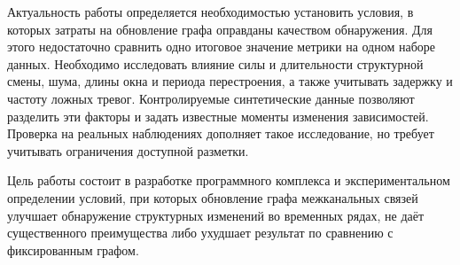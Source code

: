 \documentclass[bachelor, och, diploma]{SCWorks}
\begin{document}
Актуальность работы определяется необходимостью установить условия, в которых затраты на обновление графа оправданы качеством обнаружения. Для этого недостаточно сравнить одно итоговое значение метрики на одном наборе данных. Необходимо исследовать влияние силы и длительности структурной смены, шума, длины окна и периода перестроения, а также учитывать задержку и частоту ложных тревог. Контролируемые синтетические данные позволяют разделить эти факторы и задать известные моменты изменения зависимостей. Проверка на реальных наблюдениях дополняет такое исследование, но требует учитывать ограничения доступной разметки.

Цель работы состоит в разработке программного комплекса и экспериментальном определении условий, при которых обновление графа межканальных связей улучшает обнаружение структурных изменений во временных рядах, не даёт существенного преимущества либо ухудшает результат по сравнению с фиксированным графом.
\end{document}
